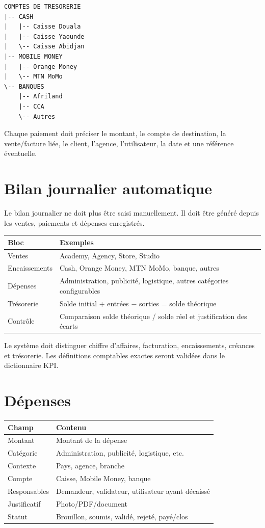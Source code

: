 \documentclass[11pt,a4paper]{article}
\newcommand{\tableheader}[2]{\textbf{#1} & \textbf{#2} \\ \hline}
\begin{document}
\begin{verbatim}
COMPTES DE TRESORERIE
|-- CASH
|   |-- Caisse Douala
|   |-- Caisse Yaounde
|   \-- Caisse Abidjan
|-- MOBILE MONEY
|   |-- Orange Money
|   \-- MTN MoMo
\-- BANQUES
    |-- Afriland
    |-- CCA
    \-- Autres
\end{verbatim}

Chaque paiement doit préciser le montant, le compte de destination, la vente/facture liée, le client, l'agence, l'utilisateur, la date et une référence éventuelle.

\section{Bilan journalier automatique}

Le bilan journalier ne doit plus être saisi manuellement. Il doit être généré depuis les ventes, paiements et dépenses enregistrés.

\begin{tabularx}{\textwidth}{|l|X|}
\hline
\tableheader{Bloc}{Exemples}
Ventes & Academy, Agency, Store, Studio \\ \hline
Encaissements & Cash, Orange Money, MTN MoMo, banque, autres \\ \hline
Dépenses & Administration, publicité, logistique, autres catégories configurables \\ \hline
Trésorerie & Solde initial + entrées $-$ sorties = solde théorique \\ \hline
Contrôle & Comparaison solde théorique / solde réel et justification des écarts \\ \hline
\end{tabularx}

Le système doit distinguer chiffre d'affaires, facturation, encaissements, créances et trésorerie. Les définitions comptables exactes seront validées dans le dictionnaire KPI.

\section{Dépenses}

\begin{tabularx}{\textwidth}{|l|X|}
\hline
\tableheader{Champ}{Contenu}
Montant & Montant de la dépense \\ \hline
Catégorie & Administration, publicité, logistique, etc. \\ \hline
Contexte & Pays, agence, branche \\ \hline
Compte & Caisse, Mobile Money, banque \\ \hline
Responsables & Demandeur, validateur, utilisateur ayant décaissé \\ \hline
Justificatif & Photo/PDF/document \\ \hline
Statut & Brouillon, soumis, validé, rejeté, payé/clos \\ \hline
\end{tabularx}
\end{document}
